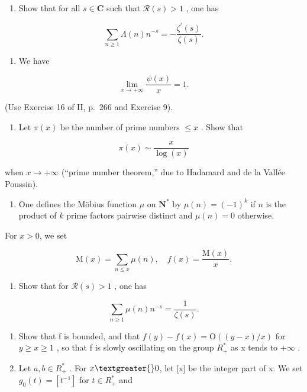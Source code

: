 \begin{enumerate}
\def\labelenumi{\alph{enumi})}
\tightlist
\item
  Show that for all \(s \in \mathbf{C}\) such that \(\mathcal{R}(s) > 1\) , one has
\end{enumerate}

\[
\sum_ {n \geqslant 1} \Lambda (n) n ^ {- s} = - \frac {\zeta^ {\prime} (s)}{\zeta (s)}.
\]

\begin{enumerate}
\def\labelenumi{\alph{enumi})}
\setcounter{enumi}{1}
\tightlist
\item
  We have
\end{enumerate}

\[
\lim _ {x \to + \infty} \frac {\psi (x)}{x} = 1.
\]

(Use Exercise 16 of II, p.~266 and Exercise 9).

\begin{enumerate}
\def\labelenumi{\alph{enumi})}
\setcounter{enumi}{2}
\tightlist
\item
  Let \(\pi(x)\) be the number of prime numbers \(\leqslant x\) . Show that
\end{enumerate}

\[
\pi (x) \sim \frac {x}{\log (x)}
\]

when \(x \to +\infty\) (“prime number theorem,” due to Hadamard and de la Vallée Poussin).

\begin{enumerate}
\def\labelenumi{\arabic{enumi})}
\setcounter{enumi}{10}
\tightlist
\item
  One defines the Möbius function \(\mu\) on \(\mathbf{N}^*\) by \(\mu(n) = (-1)^k\) if \(n\) is the product of \(k\) prime factors pairwise distinct and \(\mu(n) = 0\) otherwise.
\end{enumerate}

For \(x > 0\), we set

\[
\mathrm{M} (x) = \sum_ {n \leqslant x} \mu (n), \quad f (x) = \frac {\mathrm{M} (x)}{x}.
\]

\begin{enumerate}
\def\labelenumi{\alph{enumi})}
\tightlist
\item
  Show that for \(\mathcal{R}(s) > 1\) , one has
\end{enumerate}

\[
\sum_ {n \geqslant 1} \mu (n) n ^ {- s} = \frac {1}{\zeta (s)}.
\]

\begin{enumerate}
\def\labelenumi{\alph{enumi})}
\setcounter{enumi}{1}
\item
  Show that f is bounded, and that \(f(y) - f(x) = \mathrm{O}((y - x)/x)\) for \(y \geqslant x \geqslant 1\) , so that f is slowly oscillating on the group \(R_{+}^{*}\) as x tends to \(+\infty\) .
\item
  Let \(a, b \in R_{+}^{*}\) . For \(x \textgreater{} 0\), let {[}x{]} be the integer part of x. We set \(g_{0}(t) = [t^{-1}]\) for \(t \in R_{+}^{*}\) and
\end{enumerate}

